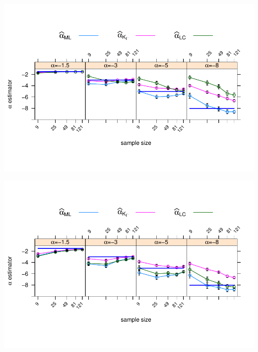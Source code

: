 \documentclass[10pt,a4paper]{article}
\begin{document}
\vspace{1cm}

\begin{minipage}{0.5\linewidth}
\includegraphics[width=\linewidth]{../../../Figures/OtroPaper/ConGeneraGIAlfaGamma/alfa500_sinmenos20NoCont_MVyNG1yLC_MetAntbarrasdeerror_L3.pdf}
\end{minipage}	
\;	
\begin{minipage}{0.5\linewidth}	
\includegraphics[width=\linewidth]{../../../Figures/OtroPaper/ConGeneraGIAlfaGamma/alfa500_sinmenos20NoCont_MVyNG1yLC_gamma10barrasdeerror_L3.pdf}
\end{minipage}	
\end{document}
